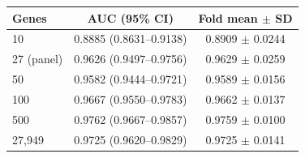 \begin{tabular}{lcc}
\toprule
Genes & AUC (95\% CI) & Fold mean $\pm$ SD \\
\midrule
10 & 0.8885 (0.8631--0.9138) & 0.8909 $\pm$ 0.0244 \\
27 (panel) & 0.9626 (0.9497--0.9756) & 0.9629 $\pm$ 0.0259 \\
50 & 0.9582 (0.9444--0.9721) & 0.9589 $\pm$ 0.0156 \\
100 & 0.9667 (0.9550--0.9783) & 0.9662 $\pm$ 0.0137 \\
500 & 0.9762 (0.9667--0.9857) & 0.9759 $\pm$ 0.0100 \\
27{,}949 & 0.9725 (0.9620--0.9829) & 0.9725 $\pm$ 0.0141 \\
\bottomrule
\end{tabular}
